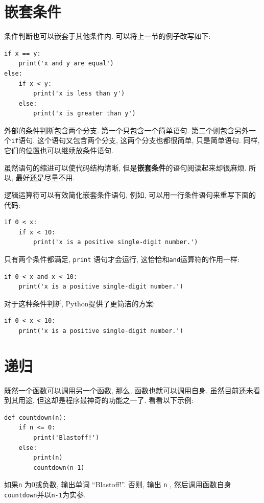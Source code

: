 \documentclass[10pt]{book}
\begin{document}
\section{嵌套条件}

条件判断也可以嵌套于其他条件内. 
可以将上一节的例子改写如下:

\begin{verbatim}
if x == y:
    print('x and y are equal')
else:
    if x < y:
        print('x is less than y')
    else:
        print('x is greater than y')
\end{verbatim}
%
外部的条件判断包含两个分支. 
第一个只包含一个简单语句. 
第二个则包含另外一个{\tt if}语句, 
这个语句又包含两个分支, 这两个分支也都很简单, 只是简单语句. 
同样, 它们的位置也可以继续放条件语句.

虽然语句的缩进可以使代码结构清晰, 但是{\bf 嵌套条件}的语句阅读起来却很麻烦. 
所以, 最好还是尽量不用. 

逻辑运算符可以有效简化嵌套条件语句, 例如, 可以用一行条件语句来重写下面的代码:

\begin{verbatim}
if 0 < x:
    if x < 10:
        print('x is a positive single-digit number.')
\end{verbatim}
%
只有两个条件都满足, {\tt print} 语句才会运行, 这恰恰和{\tt and}运算符的作用一样:

\begin{verbatim}
if 0 < x and x < 10:
    print('x is a positive single-digit number.')
\end{verbatim}

对于这种条件判断, Python提供了更简洁的方案:

\begin{verbatim}
if 0 < x < 10:
    print('x is a positive single-digit number.')
\end{verbatim}


\section{递归}
\label{recursion}

既然一个函数可以调用另一个函数, 那么, 函数也就可以调用自身. 
虽然目前还未看到其用途, 但这却是程序最神奇的功能之一了. 
看看以下示例:

\begin{verbatim}
def countdown(n):
    if n <= 0:
        print('Blastoff!')
    else:
        print(n)
        countdown(n-1)
\end{verbatim}
%
如果{\tt n} 为0或负数, 输出单词 ``Blastoff!''. 
否则, 输出{ \tt n} , 然后调用函数自身{\tt countdown}并以{\tt n-1}为实参. 
\end{document}
